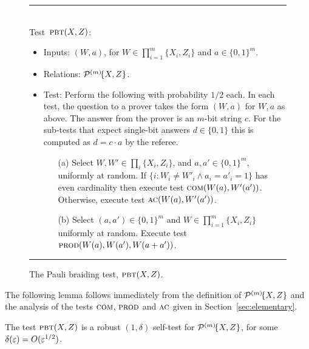 \begin{figure}[H]
\rule[1ex]{\textwidth}{0.5pt}\\
\justifying
Test~$\textsc{pbt}(X,Z)$: %
\begin{itemize}
\item Inputs: $(W,a)$, for $W\in\prod_{i=1}^m\{X_i,Z_i\}$ and $a\in\{0,1\}^m$.
\item Relations: $\mathcal{P}^{(m)}\!\{X,Z\}$.  
\item Test: Perform the following with probability $1/2$ each. In each test, the question to a prover takes the form $(W,a)$ for $W,a$ as above. The answer from the prover is an $m$-bit string $c$. For the sub-tests that expect single-bit answers $d\in \{0,1\}$ this  is computed as $d=c\cdot a$ by the referee. 
\begin{enumerate}
\item[(a)] Select $W,W'\in \prod_i \{X_i,Z_i\}$, and $a,a'\in\{0,1\}^m$, uniformly at random. If $\{i: W_i\neq W'_i \wedge a_i=a'_i=1\}$ has even cardinality then execute test $\textsc{com}(W(a),W'(a'))$. Otherwise, execute test $\textsc{ac}(W(a),W'(a'))$. 
\item[(b)] Select $(a,a')\in\{0,1\}^m$ and $W\in\prod_{i=1}^m\{X_i,Z_i\}$ uniformly at random. Execute test $\textsc{prod}(W(a),W(a'),W(a+a'))$. 
\end{enumerate}
\end{itemize}
\rule[2ex]{\textwidth}{0.5pt}\vspace{-.5cm}
\caption{The Pauli braiding test, $\textsc{pbt}(X,Z)$.}
\label{fig:pbt}
\end{figure}

The following lemma follows immediately from the definition of $\mathcal{P}^{(m)}\!\{X,Z\}$ and the analysis of the tests $\textsc{com}$, $\textsc{prod}$ and $\textsc{ac}$ given in Section~\ref{sec:elementary}. %

\begin{lemma}\label{lem:pbt}
The test $\textsc{pbt}(X,Z)$ is a robust $(1,\delta)$ self-test 
for $\mathcal{P}^{(m)}\!\{X,Z\}$, for some $\delta(\varepsilon) = O(\varepsilon^{1/2})$. 
\end{lemma}

